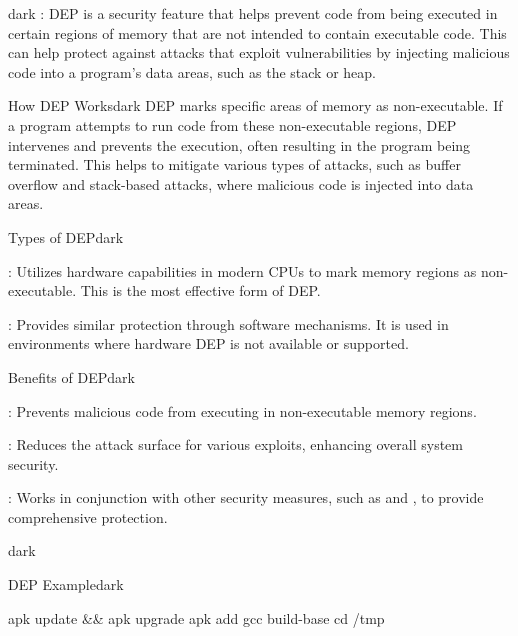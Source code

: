 \label{Data Execution Prevention (DEP)}
\begin{baseBoxThree}{}{dark}
    \bigskip
    : DEP is a security feature that helps prevent code from being executed in certain regions of memory that are not intended to contain executable code. This can help protect against attacks that exploit vulnerabilities by injecting malicious code into a program's data areas, such as the stack or heap.
    \bigskip
    \begin{baseBoxThree}{How DEP Works}{dark}
        \smallskip
        DEP marks specific areas of memory as non-executable.
        If a program attempts to run code from these non-executable regions, DEP intervenes and prevents the execution, often resulting in the program being terminated.
        This helps to mitigate various types of attacks, such as buffer overflow and stack-based attacks, where malicious code is injected into data areas.
        \smallskip
    \end{baseBoxThree}
    \smallskip
    \begin{baseBoxThree}{Types of DEP}{dark}
        \smallskip
        \begin{posnexItemize}
            \item[\sA] : Utilizes hardware capabilities in modern CPUs to mark memory regions as non-executable. This is the most effective form of DEP.
            \item[\sA] : Provides similar protection through software mechanisms. It is used in environments where hardware DEP is not available or supported.
        \end{posnexItemize}
        \smallskip
    \end{baseBoxThree}
    \smallskip
    \begin{baseBoxThree}{Benefits of DEP}{dark}
        \smallskip
        \begin{posnexItemize}
            \item[\sA] : Prevents malicious code from executing in non-executable memory regions.
            \item[\sA] : Reduces the attack surface for various exploits, enhancing overall system security.
            \item[\sA] : Works in conjunction with other security measures, such as  and , to provide comprehensive protection.
        \end{posnexItemize}
        \smallskip
    \end{baseBoxThree}
    \smallskip
\end{baseBoxThree}

\begin{baseBoxThree}{}{dark}
    \smallskip
    \begin{baseBoxThree}{DEP Example}{dark}
        \begin{posnex}
apk update && apk upgrade
apk add gcc build-base
cd /tmp
        \end{posnex}
    \end{baseBoxThree}
    \smallskip
\end{baseBoxThree}
